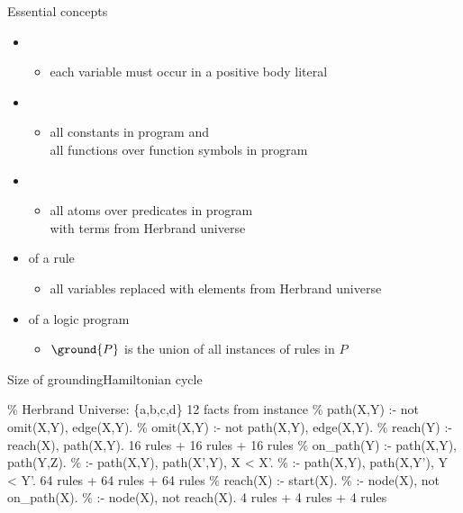 \begin{frame}{Essential concepts}
  \smallskip
  \begin{itemize}
    \item {}
      \begin{itemize}\normalsize
        \item each variable must occur in a positive body literal
      \end{itemize}
    \item {}
      \begin{itemize}\normalsize
        \item
          all constants in program and\\
          all functions over function symbols in program
      \end{itemize}
    \item {}
      \begin{itemize}\normalsize
        \item all atoms over predicates in program\\ with terms from Herbrand universe
      \end{itemize}
    \item {}  of a rule
      \begin{itemize}\normalsize
        \item all variables replaced with elements from Herbrand universe
      \end{itemize}
    \item {} of a logic program
      \begin{itemize}\normalsize
        \item \(\ground{P}\) is the union of all instances of %
              rules in \(P\)
      \end{itemize}
  \end{itemize}
\end{frame}
\begin{frame}{Size of grounding}{Hamiltonian cycle}
  \begin{SemiVerbatim}{.9}
{\color{comment}\% Herbrand Universe: \{a,b,c,d\}}
12 facts from instance
{\color{comment}\% path(X,Y) :- not omit(X,Y), edge(X,Y).}
{\color{comment}\% omit(X,Y) :- not path(X,Y), edge(X,Y).}
{\color{comment}\% reach(Y) :- reach(X), path(X,Y).}
16 rules + 16 rules + 16 rules
{\color{comment}\% on_path(Y) :- path(X,Y), path(Y,Z).}
{\color{comment}\% :- path(X,Y), path(X',Y), X < X'.}
{\color{comment}\% :- path(X,Y), path(X,Y'), Y < Y'.}
64 rules + 64 rules + 64 rules
{\color{comment}\% reach(X) :- start(X).}
{\color{comment}\% :- node(X), not on_path(X).}
{\color{comment}\% :- node(X), not reach(X).}
4 rules + 4 rules + 4 rules
  \end{SemiVerbatim}
\end{frame}
